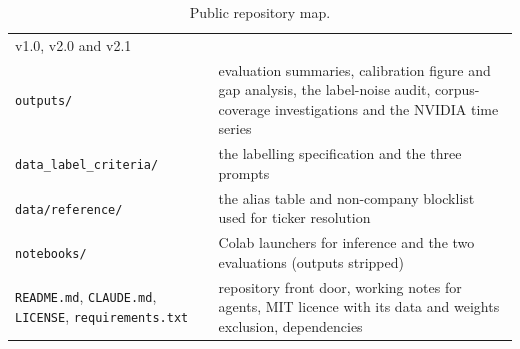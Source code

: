\documentclass[11pt,letterpaper]{article}
\newcommand{\code}[1]{\texttt{#1}}
\begin{document}
\begin{table}[H]
\begin{tabularx}{\linewidth}{@{}P{5.9cm}Y@{}}
  v1.0, v2.0 and v2.1 \\
\code{outputs/} & evaluation summaries, calibration figure and gap analysis, the label-noise
  audit, corpus-coverage investigations and the NVIDIA time series \\
\code{data\_label\_criteria/} & the labelling specification and the three prompts \\
\code{data/reference/} & the alias table and non-company blocklist used for ticker resolution \\
\code{notebooks/} & Colab launchers for inference and the two evaluations (outputs stripped) \\
\code{README.md}, \code{CLAUDE.md}, \code{LICENSE},
  \code{requirements.txt} & repository front door, working notes for agents, MIT licence with its
  data and weights exclusion, dependencies \\
\bottomrule
\end{tabularx}
\caption{Public repository map.}
\label{tab:repo}
\end{table}
\end{document}
